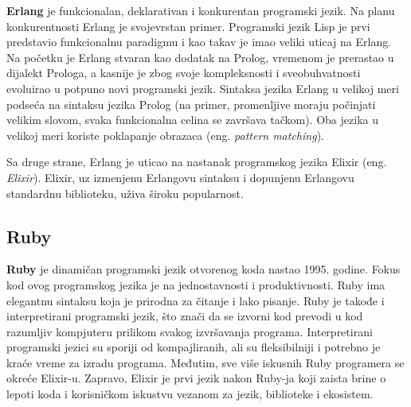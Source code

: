 \documentclass[12pt,oneside]{memoir}
\begin{document}
\textbf{Erlang} je funkcionalan, deklarativan i konkurentan programski jezik. Na planu konkurentnosti Erlang je
svojevrstan primer. Programski jezik Lisp je prvi predstavio funkcionalnu paradigmu i kao takav je imao veliki uticaj na Erlang. Na početku je Erlang stvaran kao dodatak na Prolog, vremenom je prerastao
u dijalekt Prologa, a kasnije je zbog svoje kompleksnosti i sveobuhvatnosti evoluirao u potpuno novi programski jezik. Sintaksa jezika Erlang u velikoj meri podseća na sintaksu jezika Prolog (na primer, promenljive moraju počinjati velikim slovom, svaka funkcionalna celina se završava tačkom). Oba jezika u velikoj meri koriste poklapanje obrazaca (eng. \textit{pattern matching}).

\newpage

Sa druge strane, Erlang je uticao na nastanak programskog jezika Elixir (eng. \textit{Elixir}). Elixir, uz izmenjenu Erlangovu sintaksu i dopunjenu Erlangovu
standardnu biblioteku, uživa široku popularnost.
     
\begin{comment} U funkcionalnom programiranju, funkcije se primenjuju na argumente i vrednosti. Vraćene vrednosti se koriste kao argumenti za druge funkcije. Funkcionalno programiranje je suprotno proceduralnom programiranju, gde se koriste naredbe koje menjaju okruženje programa na neki način, kao što je pripisivanje vrednosti promenljivim. U funkcionalnom programiranju, te promene okruženja se minimizuju korišćenjem vrednosti koje vraća pozvana funkcija kao direktan ulaz u drugu funkciju, bez upotrebe pripisivanja naredbi.\\
\end{comment}

\subsection{Ruby}
\textbf{Ruby} je dinamičan programski jezik otvorenog koda nastao 1995. godine. Fokus kod ovog programskog jezika je na jednostavnosti i produktivnosti. Ruby ima elegantnu sintaksu koja je prirodna za čitanje i lako pisanje.
Ruby je takođe i interpretirani programski jezik, što znači da se izvorni kod prevodi u kod razumljiv kompjuteru prilikom svakog izvršavanja programa. Interpretirani programski jezici su sporiji od kompajliranih, ali su fleksibilniji i potrebno je kraće vreme za izradu programa.
Međutim, sve više iskusnih Ruby programera se okreće Elixir-u. Zapravo, Elixir je prvi jezik nakon Ruby-ja koji zaista brine o lepoti koda i korisničkom iskustvu vezanom za jezik, biblioteke i ekosistem.
\end{document}
